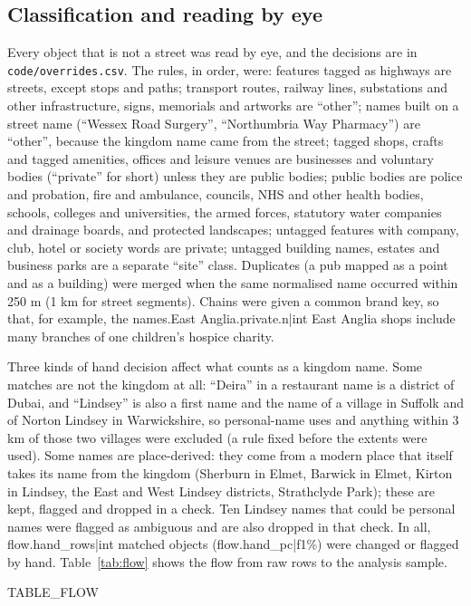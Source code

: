 \documentclass[11pt,a4paper]{article}
\begin{document}
\subsection{Classification and reading by eye}
Every object that is not a street was read by eye, and the decisions are in \texttt{code/overrides.csv}. The rules, in order, were: features tagged as highways are streets, except stops and paths; transport routes, railway lines, substations and other infrastructure, signs, memorials and artworks are ``other''; names built on a street name (``Wessex Road Surgery'', ``Northumbria Way Pharmacy'') are ``other'', because the kingdom name came from the street; tagged shops, crafts and tagged amenities, offices and leisure venues are businesses and voluntary bodies (``private'' for short) unless they are public bodies; public bodies are police and probation, fire and ambulance, councils, NHS and other health bodies, schools, colleges and universities, the armed forces, statutory water companies and drainage boards, and protected landscapes; untagged features with company, club, hotel or society words are private; untagged building names, estates and business parks are a separate ``site'' class. Duplicates (a pub mapped as a point and as a building) were merged when the same normalised name occurred within 250 m (1 km for street segments). Chains were given a common brand key, so that, for example, the {{names.East Anglia.private.n|int}} East Anglia shops include many branches of one children's hospice charity.

Three kinds of hand decision affect what counts as a kingdom name. Some matches are not the kingdom at all: ``Deira'' in a restaurant name is a district of Dubai, and ``Lindsey'' is also a first name and the name of a village in Suffolk and of Norton Lindsey in Warwickshire, so personal-name uses and anything within 3 km of those two villages were excluded (a rule fixed before the extents were used). Some names are place-derived: they come from a modern place that itself takes its name from the kingdom (Sherburn in Elmet, Barwick in Elmet, Kirton in Lindsey, the East and West Lindsey districts, Strathclyde Park); these are kept, flagged and dropped in a check. Ten Lindsey names that could be personal names were flagged as ambiguous and are also dropped in that check. In all, {{flow.hand_rows|int}} matched objects ({{flow.hand_pc|f1}}\%) were changed or flagged by hand. Table~\ref{tab:flow} shows the flow from raw rows to the analysis sample.

{{TABLE_FLOW}}
\end{document}
